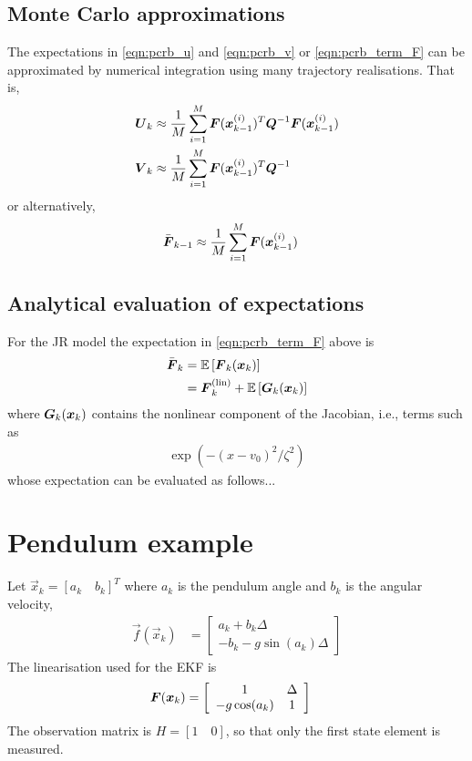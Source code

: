 \documentclass{article}
\begin{document}
\subsection{Monte Carlo approximations}

The expectations in \eqref{eqn:pcrb_u} and \eqref{eqn:pcrb_v} or \eqref{eqn:pcrb_term_F} can be approximated by numerical integration using many trajectory realisations. That is,
\begin{align}
	\boldsymbol{U}_k &\approx \frac{1}{M}\sum_{i=1}^M \boldsymbol{F}({\boldsymbol x}_{k-1}^{(i)})^T\boldsymbol{Q}^{-1} \boldsymbol{F}({\boldsymbol x}_{k-1}^{(i)}) \\
	\boldsymbol{V}_k &\approx \frac{1}{M}\sum_{i=1}^M \boldsymbol{F}({\boldsymbol x}_{k-1}^{(i)})^T\boldsymbol{Q}^{-1}  
\end{align}
or alternatively,
\begin{align}
	\bar{\boldsymbol{F}}_{k-1} &\approx \frac{1}{M}\sum_{i=1}^M \boldsymbol{F}({\boldsymbol x}_{k-1}^{(i)})
\end{align}

\subsection{Analytical evaluation of expectations}

For the JR model the expectation in \eqref{eqn:pcrb_term_F} above is
\begin{align}
	\bar{\boldsymbol{F}}_k &= \mathbb E\left[ \boldsymbol{F}_k({\boldsymbol x}_k)\right] \\
	&= \boldsymbol{F}_k^{\rm (lin)} + \mathbb E\left[ \boldsymbol{G}_k({\boldsymbol x}_k)\right] 
\end{align}
where $\boldsymbol{G}_k({\boldsymbol x}_k)$ contains the nonlinear component of the Jacobian, i.e., terms such as
\begin{align}
	\exp(-(x-v_0)^2/\zeta^2)
\end{align}
whose expectation can be evaluated as follows...


\section{Pendulum example}

Let $\vec x_k = [a_k\quad b_k]^T$ where $a_k$ is the pendulum angle and $b_k$ is the angular velocity,
\begin{align}
	\vec f(\vec x_{k}) &= \left[\begin{array}{c}
								a_k + b_k\Delta \\ -b_k - g\sin(a_k)\Delta
								\end{array}\right]
\end{align}
The linearisation used for the EKF is
\begin{align}
	\boldsymbol{F}({\boldsymbol x}_{k}) &= \left[\begin{array}{cc}
					1 & \Delta \\
					-g\cos(a_k) & 1 \\
				\end{array}\right]
\end{align}
The observation matrix is $H=[1\quad 0]$, so that only the first state element is measured.
\end{document}
